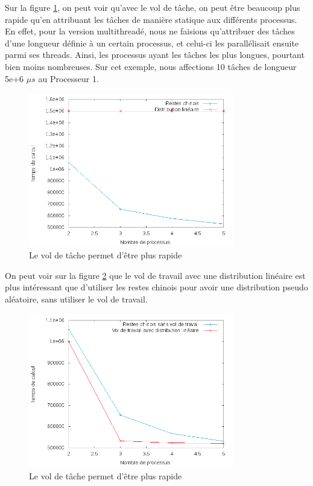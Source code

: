 Sur la figure \ref{comp_chinois_lin}, on peut voir qu'avec le vol de tâche, on peut être beaucoup plus rapide qu'en attribuant les tâches de manière statique aux différents processus. En effet, pour la version multithreadé, nous ne faisions qu'attribuer des tâches d'une longueur définie à un certain processus, et celui-ci les parallélisait ensuite parmi ses threads. Ainsi, les processus ayant les tâches les plus longues, pourtant bien moins nombreuses. Sur cet exemple, nous affections 10 tâches de longueur 5e+6 $\mu s$ au Processeur 1.
\begin{figure}[H]
\centering
\includegraphics[width=0.8\textwidth]{comp_chinois_lin.png}
\caption{Le vol de tâche permet d'être plus rapide}
\label{comp_chinois_lin}
\end{figure}
On peut voir sur la figure \ref{comp_chinois_vol} que le vol de travail avec une distribution linéaire est plus intéressant que d'utiliser les restes chinois pour avoir une distribution pseudo aléatoire, sans utiliser le vol de travail.
\begin{figure}[H]
\centering
\includegraphics[width=0.8\textwidth]{comp_chinois_vol.png}
\caption{Le vol de tâche permet d'être plus rapide}
\label{comp_chinois_vol}
\end{figure}
